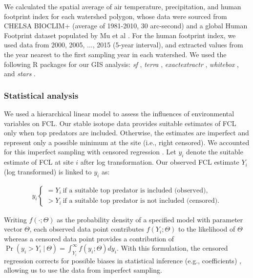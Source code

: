 \documentclass[11pt, class=article, crop=false]{standalone}
\begin{document}
We calculated the spatial average of air temperature, precipitation, and human footprint index for each watershed polygon, whose data were sourced from CHELSA BIOCLIM+ (average of 1981-2010, 30 arc-second) \citep{brun_global_2022} and a global Human Footprint dataset populated by Mu et al \citep{mu_global_2022}.
For the human footprint index, we used data from 2000, 2005, ..., 2015 (5-year interval), and extracted values from the year nearest to the first sampling year in each watershed.
We used the following R packages for our GIS analysis: \textit{sf} \citep{pkg_sf}, \textit{terra} \citep{pkg_terra}, \textit{exactextractr} \citep{pkg_exactextractr}, \textit{whitebox} \citep{pkg_whitebox}, and \textit{stars} \citep{pkg_stars}.

\subsubsection{Statistical analysis}

We used a hierarchical linear model to assess the influences of environmental variables on FCL.
Our stable isotope data provides suitable estimates of FCL only when top predators are included.
Otherwise, the estimates are imperfect and represent only a possible minimum at the site (i.e., right censored).
We accounted for this imperfect sampling with censored regression \citep{terui_stream_2018, lunn_bugs_2012}.
Let $y_i$ denote the suitable estimate of FCL at site $i$ after log transformation.
Our observed FCL estimate $Y_i$ (log transformed) is linked to $y_i$ as:

\begin{align}
    y_i 
    \begin{cases}
        = Y_i~\text{if a suitable top predator is included (observed)},\\
        > Y_i~\text{if a suitable top predator is not included (censored).}
    \end{cases}
\end{align}

Writing $f(\cdot;\Theta)$ as the probability density of a specified model with parameter vector $\Theta$, each observed data point contributes $f(Y_i;\Theta)$ to the likelihood of $\Theta$ whereas a censored data point provides a contribution of $\Pr(y_i > Y_i~|~\Theta) = \int_{Y_i}^{\infty} f(y_i;\Theta) dy_i$.
With this formulation, the censored regression corrects for possible biases in statistical inference (e.g., coefficients) \citep{terui_stream_2018, lunn_bugs_2012}, allowing us to use the data from imperfect sampling.
\end{document}
